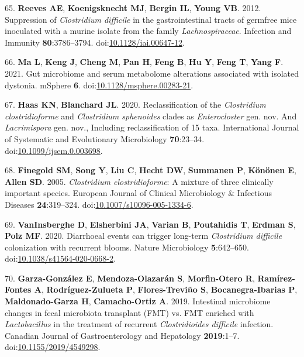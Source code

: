 \documentclass[
  12pt,
]{article}
\newenvironment{cslreferences}%
  {}%
  {\par}
\begin{document}
\begin{cslreferences}
\leavevmode\hypertarget{ref-Reeves2012}{}%
65. \textbf{Reeves AE}, \textbf{Koenigsknecht MJ}, \textbf{Bergin IL},
\textbf{Young VB}. 2012. Suppression of \emph{Clostridium difficile} in
the gastrointestinal tracts of germfree mice inoculated with a murine
isolate from the family \emph{Lachnospiraceae}. Infection and Immunity
\textbf{80}:3786--3794.
doi:\href{https://doi.org/10.1128/iai.00647-12}{10.1128/iai.00647-12}.

\leavevmode\hypertarget{ref-Ma2021}{}%
66. \textbf{Ma L}, \textbf{Keng J}, \textbf{Cheng M}, \textbf{Pan H},
\textbf{Feng B}, \textbf{Hu Y}, \textbf{Feng T}, \textbf{Yang F}. 2021.
Gut microbiome and serum metabolome alterations associated with isolated
dystonia. mSphere \textbf{6}.
doi:\href{https://doi.org/10.1128/msphere.00283-21}{10.1128/msphere.00283-21}.

\leavevmode\hypertarget{ref-Haas2020}{}%
67. \textbf{Haas KN}, \textbf{Blanchard JL}. 2020. Reclassification of
the \emph{Clostridium clostridioforme} and \emph{Clostridium sphenoides}
clades as \emph{Enterocloster} gen. nov. And \emph{Lacrimispora} gen.
nov., Including reclassification of 15 taxa. International Journal of
Systematic and Evolutionary Microbiology \textbf{70}:23--34.
doi:\href{https://doi.org/10.1099/ijsem.0.003698}{10.1099/ijsem.0.003698}.

\leavevmode\hypertarget{ref-Finegold2005}{}%
68. \textbf{Finegold SM}, \textbf{Song Y}, \textbf{Liu C}, \textbf{Hecht
DW}, \textbf{Summanen P}, \textbf{Könönen E}, \textbf{Allen SD}. 2005.
\emph{Clostridium clostridioforme}: A mixture of three clinically
important species. European Journal of Clinical Microbiology \&
Infectious Diseases \textbf{24}:319--324.
doi:\href{https://doi.org/10.1007/s10096-005-1334-6}{10.1007/s10096-005-1334-6}.

\leavevmode\hypertarget{ref-VanInsberghe2020}{}%
69. \textbf{VanInsberghe D}, \textbf{Elsherbini JA}, \textbf{Varian B},
\textbf{Poutahidis T}, \textbf{Erdman S}, \textbf{Polz MF}. 2020.
Diarrhoeal events can trigger long-term \emph{Clostridium difficile}
colonization with recurrent blooms. Nature Microbiology
\textbf{5}:642--650.
doi:\href{https://doi.org/10.1038/s41564-020-0668-2}{10.1038/s41564-020-0668-2}.

\leavevmode\hypertarget{ref-GarzaGonzalez2019}{}%
70. \textbf{Garza-González E}, \textbf{Mendoza-Olazarán S},
\textbf{Morfin-Otero R}, \textbf{Ramírez-Fontes A},
\textbf{Rodríguez-Zulueta P}, \textbf{Flores-Treviño S},
\textbf{Bocanegra-Ibarias P}, \textbf{Maldonado-Garza H},
\textbf{Camacho-Ortiz A}. 2019. Intestinal microbiome changes in fecal
microbiota transplant (FMT) vs. FMT enriched with \emph{Lactobacillus}
in the treatment of recurrent \emph{Clostridioides difficile} infection.
Canadian Journal of Gastroenterology and Hepatology \textbf{2019}:1--7.
doi:\href{https://doi.org/10.1155/2019/4549298}{10.1155/2019/4549298}.


\end{cslreferences}
\end{document}
